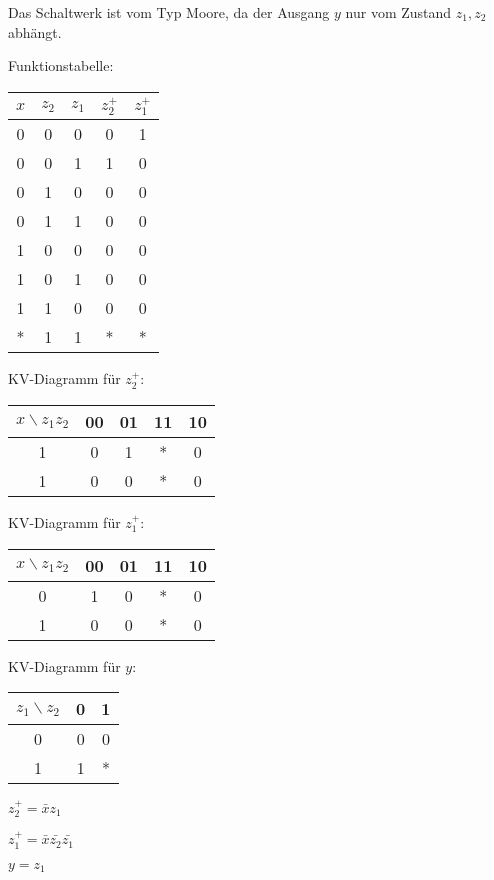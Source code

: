 \documentclass{exercisesheet}
\begin{document}
\begin{solutions}
  \item Das Schaltwerk ist vom Typ Moore, da der Ausgang $y$ nur vom Zustand $z_1, z_2$ abhängt.
  \item Funktionstabelle:
  \begin{tabular}{ccc|cc}
    $x$ & $z_2$ & $z_1$ & $z_2^+$ & $z_1^+$ \\
    \hline
    0   & 0     & 0     & 0       & 1       \\
    0   & 0     & 1     & 1       & 0       \\
    0   & 1     & 0     & 0       & 0       \\
    0   & 1     & 1     & 0       & 0       \\
    1   & 0     & 0     & 0       & 0       \\
    1   & 0     & 1     & 0       & 0       \\
    1   & 1     & 0     & 0       & 0       \\
    *   & 1     & 1     & *       & *       \\
  \end{tabular}

  KV-Diagramm für $z_2^+$:
  \begin{tabular}{c|cccc}
    $x\backslash z_1z_2$ & 00 & 01 & 11 & 10 \\
    \hline
    1                    & 0  & 1  & *  & 0  \\
    1                    & 0  & 0  & *  & 0  \\
  \end{tabular}

  KV-Diagramm für $z_1^+$:
  \begin{tabular}{c|cccc}
    $x\backslash z_1z_2$ & 00 & 01 & 11 & 10 \\
    \hline
    0                    & 1  & 0  & *  & 0  \\
    1                    & 0  & 0  & *  & 0  \\
  \end{tabular}

  KV-Diagramm für $y$:
  \begin{tabular}{c|cc}
    $z_1\backslash z_2$ & 0 & 1 \\
    \hline
    0                   & 0 & 0 \\
    1                   & 1 & * \\
  \end{tabular}
  \item
  $z_2^+ = \bar x z_1$\par
  $z_1^+ = \bar x \bar{z_2} \bar{z_1}$\par
  $y = z_1$
\end{solutions}
\end{document}
